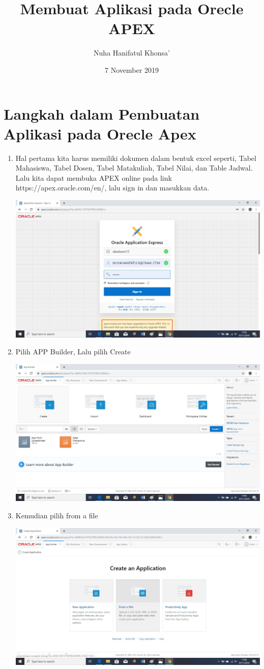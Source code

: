 \documentclass[a4paper,12pt]{report}
\title{Membuat Aplikasi pada Orecle APEX}
\author{Nuha Hanifatul Khonsa'}
\date{ 7 November 2019}
\begin{document}
\maketitle

\section{Langkah dalam Pembuatan Aplikasi pada Orecle Apex}
\begin{enumerate}
    \item Hal pertama kita harus memiliki dokumen dalam bentuk excel seperti, Tabel Mahasiswa, Tabel Dosen, Tabel Matakuliah, Tabel Nilai, dan Table Jadwal. Lalu kita dapat membuka APEX online pada link https://apex.oracle.com/en/, lalu sign in dan masukkan data.
     \begin{center}
    \includegraphics[width=11cm\textwidth]{figure/login.jpg}
    \end{center}
    \item Pilih APP Builder, Lalu pilih Create
     \begin{center}
    \includegraphics[width=11cm\textwidth]{figure/3.jpg}
    \end{center}
    \item Kemudian pilih from a file
     \begin{center}
    \includegraphics[width=11cm\textwidth]{figure/4.jpg}

\end{center}
\end{enumerate}
\end{document}

